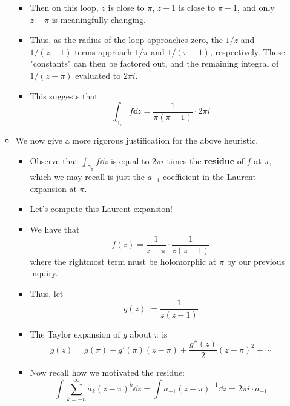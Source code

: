 \documentclass[../notes.tex]{subfiles}
\begin{document}
\begin{itemize}
\begin{itemize}
\begin{itemize}
            \item Then on this loop, $z$ is close to $\pi$, $z-1$ is close to $\pi-1$, and only $z-\pi$ is meaningfully changing.
            \item Thus, as the radius of the loop approaches zero, the $1/z$ and $1/(z-1)$ terms approach $1/\pi$ and $1/(\pi-1)$, respectively. These "constants" can then be factored out, and the remaining integral of $1/(z-\pi)$ evaluated to $2\pi i$.
            \item This suggests that
            \begin{equation*}
                \int_{\gamma_\pi}f\dd{z} = \frac{1}{\pi(\pi-1)}\cdot 2\pi i
            \end{equation*}
        \end{itemize}
        \item We now give a more rigorous justification for the above heuristic.
        \begin{itemize}
            \item Observe that $\int_{\gamma_\pi}f\dd{z}$ is equal to $2\pi i$ times the \textbf{residue} of $f$ at $\pi$, which we may recall is just the $a_{-1}$ coefficient in the Laurent expansion at $\pi$.
            \item Let's compute this Laurent expansion!
            \item We have that
            \begin{equation*}
                f(z) = \frac{1}{z-\pi}\cdot\frac{1}{z(z-1)}
            \end{equation*}
            where the rightmost term must be holomorphic at $\pi$ by our previous inquiry.
            \item Thus, let
            \begin{equation*}
                g(z) := \frac{1}{z(z-1)}
            \end{equation*}
            \item The Taylor expansion of $g$ about $\pi$ is
            \begin{equation*}
                g(z) = g(\pi)+g'(\pi)(z-\pi)+\frac{g''(z)}{2}(z-\pi)^2+\cdots
            \end{equation*}
            \item Now recall how we motivated the residue:
            \begin{equation*}
                \int\sum_{k=-n}^\infty a_k(z-\pi)^k\dd{z} = \int a_{-1}(z-\pi)^{-1}\dd{z} = 2\pi i\cdot a_{-1}
            \end{equation*}

\end{itemize}
\end{itemize}
\end{itemize}
\end{document}
